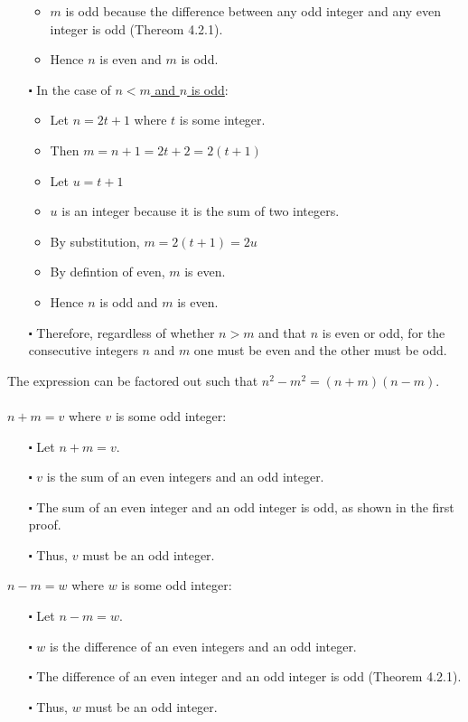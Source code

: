 \documentclass[12pt]{article}
\begin{document}
\begin{itemize}
\begin{itemize}
    \item $m$ is odd because the difference between any odd integer and any even integer is odd (Thereom 4.2.1).
    \item Hence $n$ is even and $m$ is odd.
  \end{itemize}
  \item [$\centerdot$] In the case of \underline{$n<m$ and $n$ is odd}:
  \begin{itemize}
    \item Let $n = 2t+1$ where $t$ is some integer.
    \item Then $m = n+1 = 2t+2 = 2(t+1)$
    \item Let $u=t+1$
    \item $u$ is an integer because it is the sum of two integers.
    \item By substitution, $m = 2(t+1) = 2u$
    \item By defintion of even, $m$ is even.
    \item Hence $n$ is odd and $m$ is even.
  \end{itemize}
  \item [$\centerdot$] Therefore, regardless of whether $n>m$ and that $n$ is even or odd,
  for the consecutive integers $n$ and $m$ one must be even and the other must be odd.
\end{itemize}
The expression can be factored out such that $n^2 - m^2 = (n+m)(n-m)$. 
\\ \\
\newblock
$n+m = v$ where $v$ is some odd integer:
\begin{itemize}
  \item [$\centerdot$] Let $n+m = v$.
  \item [$\centerdot$] $v$ is the sum of an even integers and an odd integer.
  \item [$\centerdot$] The sum of an even integer and an odd integer is odd, as shown in the first proof.
  \item [$\centerdot$] Thus, $v$ must be an odd integer.
\end{itemize} 
\newblock
$n-m = w$ where $w$ is some odd integer:
\begin{itemize}
  \item [$\centerdot$] Let $n-m = w$.
  \item [$\centerdot$] $w$ is the difference of an even integers and an odd integer.
  \item [$\centerdot$] The difference of an even integer and an odd integer is odd (Theorem 4.2.1).
  \item [$\centerdot$] Thus, $w$ must be an odd integer.
\end{itemize} 
\end{document}
